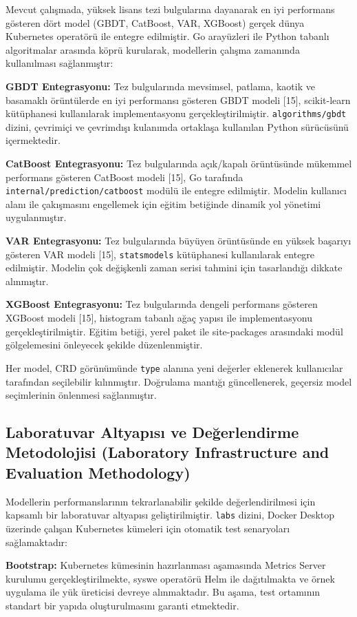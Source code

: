 \documentclass[12pt,a4paper]{article}
\begin{document}
Mevcut çalışmada, yüksek lisans tezi bulgularına dayanarak en iyi performans gösteren dört model (GBDT, CatBoost, VAR, XGBoost) gerçek dünya Kubernetes operatörü ile entegre edilmiştir. Go arayüzleri ile Python tabanlı algoritmalar arasında köprü kurularak, modellerin çalışma zamanında kullanılması sağlanmıştır:

\textbf{GBDT Entegrasyonu:} Tez bulgularında mevsimsel, patlama, kaotik ve basamaklı örüntülerde en iyi performansı gösteren GBDT modeli [15], scikit-learn kütüphanesi kullanılarak implementasyonu gerçekleştirilmiştir. \texttt{algorithms/gbdt} dizini, çevrimiçi ve çevrimdışı kulanımda ortaklaşa kullanılan Python sürücüsünü içermektedir.

\textbf{CatBoost Entegrasyonu:} Tez bulgularında açık/kapalı örüntüsünde mükemmel performans gösteren CatBoost modeli [15], Go tarafında \texttt{internal/prediction/catboost} modülü ile entegre edilmiştir. Modelin kullanıcı alanı ile çakışmasını engellemek için eğitim betiğinde dinamik yol yönetimi uygulanmıştır.

\textbf{VAR Entegrasyonu:} Tez bulgularında büyüyen örüntüsünde en yüksek başarıyı gösteren VAR modeli [15], \texttt{statsmodels} kütüphanesi kullanılarak entegre edilmiştir. Modelin çok değişkenli zaman serisi tahmini için tasarlandığı dikkate alınmıştır.

\textbf{XGBoost Entegrasyonu:} Tez bulgularında dengeli performans gösteren XGBoost modeli [15], histogram tabanlı ağaç yapısı ile implementasyonu gerçekleştirilmiştir. Eğitim betiği, yerel paket ile site-packages arasındaki modül gölgelemesini önleyecek şekilde düzenlenmiştir.

Her model, CRD görünümünde \texttt{type} alanına yeni değerler eklenerek kullanıcılar tarafından seçilebilir kılınmıştır. Doğrulama mantığı güncellenerek, geçersiz model seçimlerinin önlenmesi sağlanmıştır.

\subsection{Laboratuvar Altyapısı ve Değerlendirme Metodolojisi (Laboratory Infrastructure and Evaluation Methodology)}

Modellerin performanslarının tekrarlanabilir şekilde değerlendirilmesi için kapsamlı bir laboratuvar altyapısı geliştirilmiştir. \texttt{labs} dizini, Docker Desktop üzerinde çalışan Kubernetes kümeleri için otomatik test senaryoları sağlamaktadır:

\textbf{Bootstrap:} Kubernetes kümesinin hazırlanması aşamasında Metrics Server kurulumu gerçekleştirilmekte, syswe operatörü Helm ile dağıtılmakta ve örnek uygulama ile yük üreticisi devreye alınmaktadır. Bu aşama, test ortamının standart bir yapıda oluşturulmasını garanti etmektedir.
\end{document}
